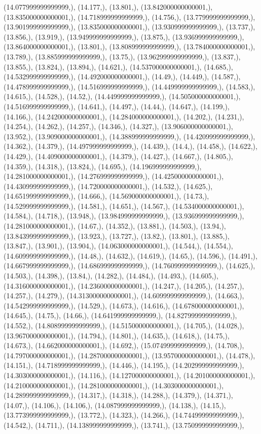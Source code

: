 \documentclass{article}
\begin{document}
(14.077999999999999,), (14.177,), (13.801,), (13.842000000000001,), (13.835000000000001,), (14.718999999999999,), (14.756,), (13.779999999999999,), (13.901999999999999,), (13.835000000000001,), (13.930999999999999,), (13.737,), (13.856,), (13.919,), (13.949999999999999,), (13.875,), (13.936999999999999,), (13.864000000000001,), (13.801,), (13.808999999999999,), (13.784000000000001,), (13.789,), (13.885999999999999,), (13.75,), (13.962999999999999,), (13.837,), (13.855,), (13.824,), (13.894,), (14.621,), (14.537000000000001,), (14.685,), (14.532999999999999,), (14.492000000000001,), (14.49,), (14.449,), (14.587,), (14.478999999999999,), (14.516999999999999,), (14.449999999999999,), (14.583,), (14.615,), (14.528,), (14.52,), (14.449999999999999,), (14.505000000000001,), (14.516999999999999,), (14.641,), (14.497,), (14.44,), (14.647,), (14.199,), (14.166,), (14.242000000000001,), (14.284000000000001,), (14.202,), (14.231,), (14.254,), (14.262,), (14.257,), (14.346,), (14.327,), (13.906000000000001,), (13.952,), (13.909000000000001,), (14.388999999999999,), (14.420999999999999,), (14.362,), (14.379,), (14.497999999999999,), (14.439,), (14.4,), (14.458,), (14.622,), (14.429,), (14.409000000000001,), (14.379,), (14.427,), (14.667,), (14.805,), (14.359,), (14.318,), (13.824,), (14.695,), (14.196999999999999,), (14.281000000000001,), (14.276999999999999,), (14.425000000000001,), (14.430999999999999,), (14.720000000000001,), (14.532,), (14.625,), (14.651999999999999,), (14.666,), (14.569000000000001,), (14.73,), (14.529999999999999,), (14.581,), (14.651,), (14.567,), (14.534000000000001,), (14.584,), (14.718,), (13.948,), (13.984999999999999,), (13.936999999999999,), (14.281000000000001,), (14.67,), (14.352,), (13.881,), (14.503,), (13.94,), (13.843999999999999,), (13.923,), (13.727,), (13.82,), (13.801,), (13.885,), (13.847,), (13.901,), (13.904,), (14.063000000000001,), (14.544,), (14.554,), (14.609999999999999,), (14.48,), (14.632,), (14.619,), (14.65,), (14.596,), (14.491,), (14.667999999999999,), (14.686999999999999,), (14.760999999999999,), (14.625,), (14.503,), (14.398,), (13.84,), (14.282,), (14.484,), (14.493,), (14.605,), (14.316000000000001,), (14.236000000000001,), (14.247,), (14.205,), (14.257,), (14.257,), (14.279,), (14.313000000000001,), (14.609999999999999,), (14.663,), (14.542999999999999,), (14.529,), (14.673,), (14.616,), (14.678000000000001,), (14.645,), (14.75,), (14.66,), (14.641999999999999,), (14.827999999999999,), (14.552,), (14.808999999999999,), (14.515000000000001,), (14.705,), (14.028,), (13.967000000000001,), (14.794,), (14.801,), (14.635,), (14.618,), (14.75,), (14.673,), (14.662000000000001,), (14.692,), (15.074999999999999,), (14.708,), (14.797000000000001,), (14.287000000000001,), (13.957000000000001,), (14.478,), (14.151,), (14.718999999999999,), (14.446,), (14.195,), (14.202999999999999,), (14.303000000000001,), (14.116,), (14.127000000000001,), (14.201000000000001,), (14.210000000000001,), (14.281000000000001,), (14.303000000000001,), (14.289999999999999,), (14.317,), (14.318,), (14.288,), (14.379,), (14.371,), (14.07,), (14.106,), (14.106,), (14.087999999999999,), (14.138,), (14.15,), (13.773999999999999,), (13.772,), (14.323,), (14.266,), (14.744999999999999,), (14.542,), (14.711,), (14.138999999999999,), (13.741,), (13.750999999999999,), 
\end{document}
